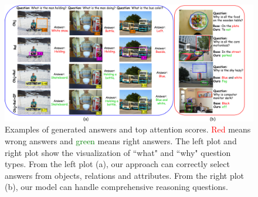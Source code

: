 \documentclass[letterpaper]{article} %
\begin{document}

\begin{figure}[ht] 
    \vspace{-0.5in}
    \centering 
    \includegraphics[width=1\textwidth]{./pic/visual_aaai2.pdf} 
    \caption{Examples of generated answers and top attention scores. \textcolor{red}{Red} means wrong answers and \textcolor{green}{green} means right answers. The left plot and right plot show the visualization of ``what" and ``why" question types. From the left plot (a), our approach can correctly select answers from objects, relations and attributes. From the right plot (b), our model can handle comprehensive reasoning questions.} 
    \label{visual} 
    \vspace{-0.1in}
\end{figure}
\end{document}
